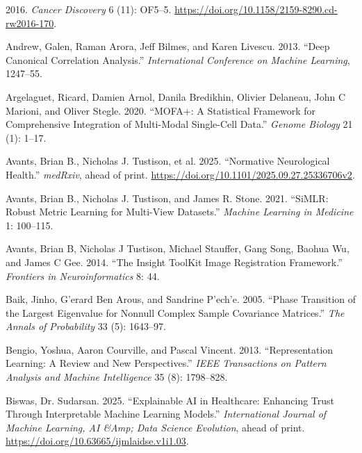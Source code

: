 \documentclass[
  letterpaper,
]{report}
\newlength{\cslhangindent}
\newenvironment{CSLReferences}[2] %
 {\begin{list}{}{%
  \setlength{\itemindent}{0pt}
  \setlength{\leftmargin}{0pt}
  \setlength{\parsep}{0pt}
  \ifodd #1
   \setlength{\leftmargin}{\cslhangindent}
   \setlength{\itemindent}{-1\cslhangindent}
  \fi
  \setlength{\itemsep}{#2\baselineskip}}}
 {\end{list}}
\begin{document}
\protect{}\label{refs}
\begin{CSLReferences}{1}{1}
2016. \emph{Cancer Discovery} 6 (11): OF5--5.
\url{https://doi.org/10.1158/2159-8290.cd-rw2016-170}.

Andrew, Galen, Raman Arora, Jeff Bilmes, and Karen Livescu. 2013.
{``Deep Canonical Correlation Analysis.''} \emph{International
Conference on Machine Learning}, 1247--55.

Argelaguet, Ricard, Damien Arnol, Danila Bredikhin, Olivier Delaneau,
John C Marioni, and Oliver Stegle. 2020. {``MOFA+: A Statistical
Framework for Comprehensive Integration of Multi-Modal Single-Cell
Data.''} \emph{Genome Biology} 21 (1): 1--17.

{Avants, Brian B., Nicholas J. Tustison, et al.} 2025. {``Normative
Neurological Health.''} \emph{medRxiv}, ahead of print.
\url{https://doi.org/10.1101/2025.09.27.25336706v2}.

Avants, Brian B., Nicholas J. Tustison, and James R. Stone. 2021.
{``SiMLR: Robust Metric Learning for Multi-View Datasets.''}
\emph{Machine Learning in Medicine} 1: 100--115.

Avants, Brian B, Nicholas J Tustison, Michael Stauffer, Gang Song,
Baohua Wu, and James C Gee. 2014. {``The Insight ToolKit Image
Registration Framework.''} \emph{Frontiers in Neuroinformatics} 8: 44.

Baik, Jinho, G'erard Ben Arous, and Sandrine P'ech'e. 2005. {``Phase
Transition of the Largest Eigenvalue for Nonnull Complex Sample
Covariance Matrices.''} \emph{The Annals of Probability} 33 (5):
1643--97.

Bengio, Yoshua, Aaron Courville, and Pascal Vincent. 2013.
{``Representation Learning: A Review and New Perspectives.''} \emph{IEEE
Transactions on Pattern Analysis and Machine Intelligence} 35 (8):
1798--828.

Biswas, Dr. Sudarsan. 2025. {``Explainable AI in Healthcare: Enhancing
Trust Through Interpretable Machine Learning Models.''}
\emph{International Journal of Machine Learning, AI \&Amp; Data Science
Evolution}, ahead of print.
\url{https://doi.org/10.63665/ijmlaidse.v1i1.03}.


\end{CSLReferences}
\end{document}
